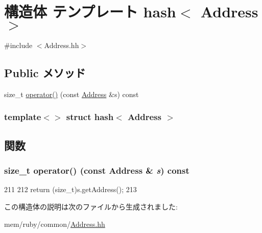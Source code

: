 \hypertarget{structhash_3_01Address_01_4}{
\section{構造体 テンプレート hash$<$ Address $>$}
\label{structhash_3_01Address_01_4}
}


{\ttfamily \#include $<$Address.hh$>$}\subsection*{Public メソッド}
\begin{DoxyCompactItemize}
\item 
size\_\-t \hyperlink{structhash_3_01Address_01_4_a879bcb03a1c77ffa0d8293b71caebb5e}{operator()} (const \hyperlink{classAddress}{Address} \&s) const 
\end{DoxyCompactItemize}
\subsubsection*{template$<$$>$ struct hash$<$ Address $>$}



\subsection{関数}
\hypertarget{structhash_3_01Address_01_4_a879bcb03a1c77ffa0d8293b71caebb5e}{
\subsubsection[{operator()}]{\setlength{\rightskip}{0pt plus 5cm}size\_\-t operator() (const {\bf Address} \& {\em s}) const}}
\label{structhash_3_01Address_01_4_a879bcb03a1c77ffa0d8293b71caebb5e}



\begin{DoxyCode}
211     {
212         return (size_t)s.getAddress();
213     }
\end{DoxyCode}


この構造体の説明は次のファイルから生成されました:\begin{DoxyCompactItemize}
\item 
mem/ruby/common/\hyperlink{Address_8hh}{Address.hh}\end{DoxyCompactItemize}
